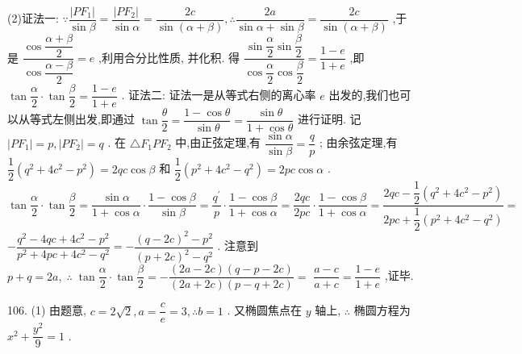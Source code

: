 (2)证法一: $\because \dfrac{\left| P{F}_{1}\right| }{\sin \beta } = \dfrac{\left| P{F}_{2}\right| }{\sin \alpha } = \dfrac{2c}{\sin \left( {\alpha  + \beta }\right) },\therefore \dfrac{2a}{\sin \alpha  + \sin \beta } = \dfrac{2c}{\sin \left( {\alpha  + \beta }\right) }$ ,于是 $\dfrac{\cos \dfrac{\alpha  + \beta }{2}}{\cos \dfrac{\alpha  - \beta }{2}} = e$ ,利用合分比性质, 并化积. 得 $\dfrac{\sin \dfrac{\alpha }{2}\sin \dfrac{\beta }{2}}{\cos \dfrac{\alpha }{2}\cos \dfrac{\beta }{2}} = \dfrac{1 - e}{1 + e}$ ,即 $\tan \dfrac{\alpha }{2} \cdot  \tan \dfrac{\beta }{2} = \dfrac{1 - e}{1 + e}$ . 证法二: 证法一是从等式右侧的离心率 $e$ 出发的,我们也可以从等式左侧出发,即通过 $\tan \dfrac{\theta }{2} = \dfrac{1 - \cos \theta }{\sin \theta } = \dfrac{\sin \theta }{1 + \cos \theta }$ 进行证明. 记 $\left| {P{F}_{1}}\right|  = p,\left| {P{F}_{2}}\right|  = q$ . 在 $\bigtriangleup {F}_{1}P{F}_{2}$ 中,由正弦定理,有 $\dfrac{\sin \alpha }{\sin \beta } = \dfrac{q}{p}$ ; 由余弦定理,有 $\dfrac{1}{2}\left( {{q}^{2} + 4{c}^{2} - {p}^{2}}\right)  = {2qc}\cos \beta$ 和 $\dfrac{1}{2}\left( {{p}^{2} + 4{c}^{2} - {q}^{2}}\right)  = {2pc}\cos \alpha$ . $\tan \dfrac{\alpha }{2} \cdot  \tan \dfrac{\beta }{2} = \dfrac{\sin \alpha }{1 + \cos \alpha } \cdot  \dfrac{1 - \cos \beta }{\sin \beta } = \dfrac{{q}^{\prime }}{p} \cdot  \dfrac{1 - \cos \beta }{1 + \cos \alpha } = \dfrac{2qc}{2pc} \cdot  \dfrac{1 - \cos \beta }{1 + \cos \alpha } = \dfrac{{2qc} - \dfrac{1}{2}\left( {{q}^{2} + 4{c}^{2} - {p}^{2}}\right) }{{2pc} + \dfrac{1}{2}\left( {{p}^{2} + 4{c}^{2} - {q}^{2}}\right) } =$  $- \dfrac{{q}^{2} - {4qc} + 4{c}^{2} - {p}^{2}}{{p}^{2} + {4pc} + 4{c}^{2} - {q}^{2}} =  - \dfrac{{\left( q - 2c\right) }^{2} - {p}^{2}}{{\left( p + 2c\right) }^{2} - {q}^{2}}$ . 注意到 $p + q = {2a},\;\therefore \;\tan \dfrac{\alpha }{2} \cdot  \tan \dfrac{\beta }{2} =  - \dfrac{\left( {{2a} - {2c}}\right) \left( {q - p - {2c}}\right) }{\left( {{2a} + {2c}}\right) \left( {p - q + {2c}}\right) } =$  $\dfrac{a - c}{a + c} = \dfrac{1 - e}{1 + e}$ ,证毕.

106. (1) 由题意, $c = 2\sqrt{2},a = \dfrac{c}{e} = 3,\therefore b = 1$ . 又椭圆焦点在 $y$ 轴上, $\therefore$ 椭圆方程为 ${x}^{2} + \dfrac{{y}^{2}}{9} = 1$ .

